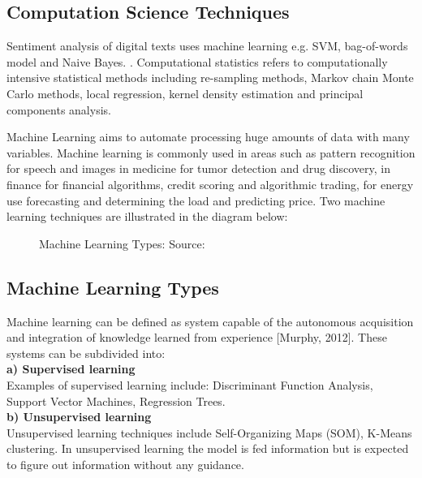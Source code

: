 \subsection{Computation Science Techniques}
Sentiment analysis of digital texts uses machine learning e.g.  SVM, bag-of-words model and Naive Bayes.
\cite{ref26}. Computational statistics refers to computationally intensive statistical methods
including re-sampling methods, Markov chain Monte Carlo methods, local regression, kernel
density estimation and principal components analysis. 

Machine Learning aims to automate processing huge amounts of data with many variables. Machine learning is commonly used in areas such as pattern recognition for speech and  images
in medicine for tumor detection and drug discovery, in finance for financial algorithms, credit scoring and algorithmic trading, for energy use forecasting and determining the load and predicting price.
Two machine learning techniques are illustrated in the diagram below:


\begin{figure}[h]
  \centering
  \caption[Machine learning types]%
  {Machine Learning Types: Source: \cite{ref49}}
  \label{fig:ALAP:sm3}
\end{figure}


\clearpage
\subsection{Machine Learning Types}

Machine learning can be defined as system capable of the autonomous acquisition and integration of knowledge learned from experience [Murphy, 2012].
These systems can be subdivided into:
\leavevmode\\
\textbf{a) Supervised learning}\\
Examples of supervised learning include: Discriminant Function Analysis, Support Vector Machines, Regression Trees.\\
\textbf{b) Unsupervised learning}\\
Unsupervised learning techniques include Self-Organizing Maps (SOM), K-Means clustering.
In unsupervised learning the model is fed information but is expected to figure out information without any guidance.
\leavevmode\\

